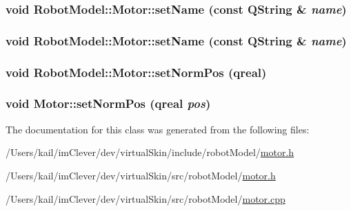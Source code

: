 \label{class_robot_model_1_1_motor_a404e359dac5e3af43860948d9e35f725}
\hypertarget{class_robot_model_1_1_motor_a9efaa43179205b53df370f7811023eb6}{
\subsubsection[{setName}]{\setlength{\rightskip}{0pt plus 5cm}void RobotModel::Motor::setName (const QString \& {\em name})}}
\label{class_robot_model_1_1_motor_a9efaa43179205b53df370f7811023eb6}
\hypertarget{class_robot_model_1_1_motor_a9efaa43179205b53df370f7811023eb6}{
\subsubsection[{setName}]{\setlength{\rightskip}{0pt plus 5cm}void RobotModel::Motor::setName (const QString \& {\em name})}}
\label{class_robot_model_1_1_motor_a9efaa43179205b53df370f7811023eb6}
\hypertarget{class_robot_model_1_1_motor_a1900f848b543b1ec78701b92d9a1cfcb}{
\subsubsection[{setNormPos}]{\setlength{\rightskip}{0pt plus 5cm}void RobotModel::Motor::setNormPos (qreal)}}
\label{class_robot_model_1_1_motor_a1900f848b543b1ec78701b92d9a1cfcb}
\hypertarget{class_robot_model_1_1_motor_a2c26ea7475deaef6e1546edbadf88729}{
\subsubsection[{setNormPos}]{\setlength{\rightskip}{0pt plus 5cm}void Motor::setNormPos (qreal {\em pos})}}
\label{class_robot_model_1_1_motor_a2c26ea7475deaef6e1546edbadf88729}


The documentation for this class was generated from the following files:\begin{DoxyCompactItemize}
\item 
/Users/kail/imClever/dev/virtualSkin/include/robotModel/\hyperlink{include_2robot_model_2motor_8h}{motor.h}\item 
/Users/kail/imClever/dev/virtualSkin/src/robotModel/\hyperlink{src_2robot_model_2motor_8h}{motor.h}\item 
/Users/kail/imClever/dev/virtualSkin/src/robotModel/\hyperlink{motor_8cpp}{motor.cpp}\end{DoxyCompactItemize}
